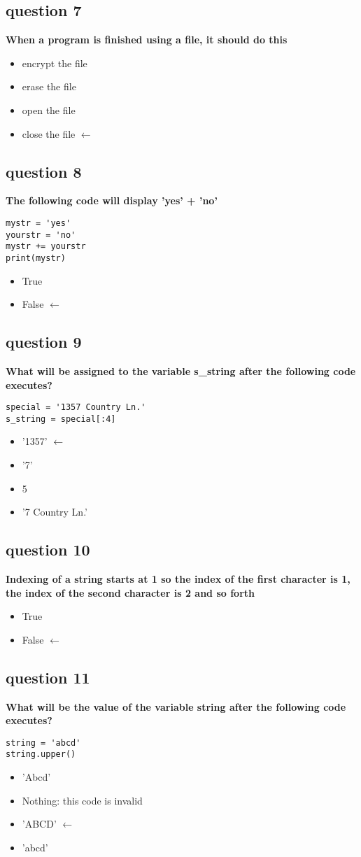 \documentclass[10pt]{article}
\begin{document}
\subsection*{question 7}
\textbf{When a program is finished using a file, it should do this}
\begin{itemize}
\item encrypt the file
\item erase the file
\item open the file
\item close the file $\leftarrow$
\end{itemize}
\subsection*{question 8}
\textbf{The following code will display 'yes' + 'no'}
\begin{verbatim}
mystr = 'yes'
yourstr = 'no'
mystr += yourstr
print(mystr)
\end{verbatim}
\begin{itemize}
\item True
\item False $\leftarrow$
\end{itemize}
\subsection*{question 9}
\textbf{What will be assigned to the variable s\_string after the following code executes?}
\begin{verbatim}
special = '1357 Country Ln.'
s_string = special[:4]
\end{verbatim}
\begin{itemize}
\item '1357' $\leftarrow$
\item '7'
\item 5
\item '7 Country Ln.'
\end{itemize}
\subsection{question 10}
\textbf{Indexing of a string starts at 1 so the index of the first character is 1, the index of the second character is 2 and so forth}
\begin{itemize}
\item True
\item False $\leftarrow$
\end{itemize}
\subsection*{question 11}
\textbf{What will be the value of the variable string after the following code executes?}\begin{verbatim}
string = 'abcd'
string.upper()
\end{verbatim}
\begin{itemize}
\item 'Abcd'
\item Nothing: this code is invalid
\item 'ABCD' $\leftarrow$
\item 'abcd'
\end{itemize}
\end{document}
